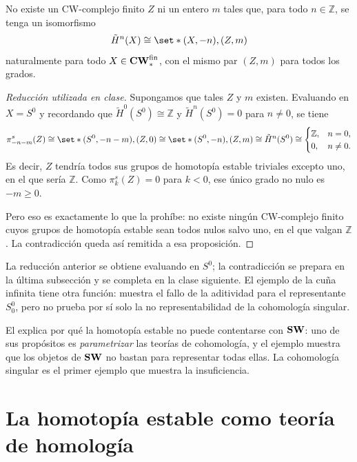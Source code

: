 \begin{teo}\label{teo:no-representable}
No existe un CW-complejo finito $Z$ ni un entero $m$ tales que, para todo $n\in\mathbb Z$, se tenga un isomorfismo
\[
\tilde H^n(X)\cong\set*{(X,-n),(Z,m)}
\]
naturalmente para todo $X\in\mathbf{CW}_*^{\mathrm{fin}}$, con el mismo par $(Z,m)$ para todos los grados.
\end{teo}
\begin{proof}[Reducción utilizada en clase]
Supongamos que tales $Z$ y $m$ existen. Evaluando en $X=S^0$ y recordando que $\tilde H^0(S^0)\cong\mathbb Z$ y $\tilde H^n(S^0)=0$ para $n\neq0$, se tiene
\[
\pi^s_{-n-m}(Z)
\cong\set*{(S^0,-n-m),(Z,0)}
\cong\set*{(S^0,-n),(Z,m)}
\cong \Tilde{H}^n(S^0)
\cong
\begin{cases}
\mathbb Z, & n=0,\\
0, & n\neq0 .
\end{cases}
\]
Es decir, $Z$ tendría todos sus grupos de homotopía estable triviales excepto uno, en el que sería $\mathbb Z$. Como $\pi^s_k(Z)=0$ para $k<0$, ese único grado no nulo es $-m\ge0$.

Pero eso es exactamente lo que la  prohíbe: no existe ningún CW-complejo finito cuyos grupos de homotopía estable sean todos nulos salvo uno, en el que valgan $\mathbb Z$. La contradicción queda así remitida a esa proposición.
\end{proof}

\begin{nota}
   La reducción anterior se obtiene evaluando en $S^0$; la contradicción se prepara en la última subsección y se completa en la clase siguiente. El ejemplo de la cuña infinita tiene otra función: muestra el fallo de la aditividad para el representante $S^0_0$, pero no prueba por sí solo la no representabilidad de la cohomología singular.
\end{nota}

\begin{nota}
   El  explica por qué la homotopía estable no puede contentarse con $\mathbf{SW}$: uno de sus propósitos es \emph{parametrizar} las teorías de cohomología, y el ejemplo muestra que los objetos de $\mathbf{SW}$ no bastan para representar todas ellas. La cohomología singular es el primer ejemplo que muestra la insuficiencia.
\end{nota}

\section{La homotopía estable como teoría de homología}

